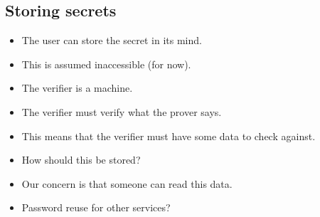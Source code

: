\subsection{Storing secrets}

\begin{frame}
  \begin{remark}
    \begin{itemize}
      \item The user can store the secret in its mind.
      \item This is assumed inaccessible (for now).
    \end{itemize}
  \end{remark}

  \pause

  \begin{question}
    \begin{itemize}
      \item The verifier is a machine.
      \item The verifier must verify what the prover says.
      \item This means that the verifier must have some data to check against.
      \item How should this be stored?
    \end{itemize}
  \end{question}
\end{frame}

\begin{frame}
  \begin{remark}
    \begin{itemize}
      \item Our concern is that someone can read this data.
      \item Password reuse for other services?
    \end{itemize}
  \end{remark}
\end{frame}

